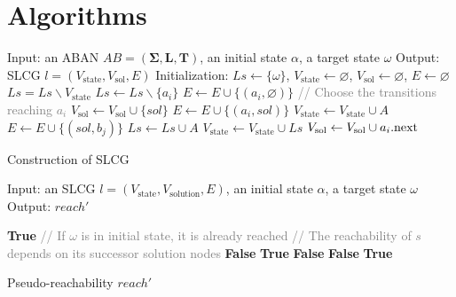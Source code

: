 \documentclass[runningheads]{llncs}
\newcommand{\st}{{\mathrm{state}}}
\newcommand{\sol}{{\mathrm{sol}}}
\begin{document}
\section{Algorithms}\label{appendix:algo}
\begin{algorithm}[ht]
\begin{algorithmic}
\State Input: an ABAN $AB=(\mathbf{\Sigma},\mathbf{L},\mathbf{T})$, an initial state $\alpha$, a target state $\omega$
\State Output: SLCG $l=(V_\st,V_\sol, E)$
\State Initialization: 
$Ls\gets \{\omega\}$, $V_\st\gets\varnothing$, $V_\sol\gets \varnothing$, $E\gets \varnothing$
    \State $Ls=Ls\backslash V_\st$
		\State $Ls\gets Ls\backslash \{a_i\}$
			$E\gets E\cup \{(a_i,\varnothing)\} $
    	\Else
    		 \textcolor{gray}{// Choose the transitions reaching $a_i$}
    		    \State $V_\sol\gets V_\sol\cup \{sol\}$
    		    \State $E\gets E\cup \{(a_i,sol)\} $
    			\State $V_\st\gets V_\st\cup {A}$
    				\State $E\gets E\cup \{(sol,b_j)\} $
    			\EndFor
    			\State $Ls\gets Ls\cup A$
                \State $V_\st\gets V_\st\cup Ls$
    		\EndFor
    		\State$V_\sol\gets V_\sol\cup a_i{\rm .next}$           
    	\EndIf
	\EndFor
\EndWhile
\State\Return{$(V_\st,V_\sol,E)$}
\end{algorithmic}
\caption{Construction of SLCG}\label{AlgConstructLCG}
\end{algorithm}

\begin{algorithm}[ht]
\begin{algorithmic}
\State Input: an SLCG $l=(V_\st, {V_\mathrm{solution}},E)$, an initial state $\alpha$, a target state $\omega$
\State Output:  $reach'$

\If {$\omega\in \alpha$}
   \Return \textbf{True} \textcolor{gray}{// If $\omega$ is in initial state, it is already reached}
\EndIf
\State \textcolor{gray}{// The reachability of $s$ depends on its successor solution nodes}
    \Return \textbf{False}
\EndIf
{}
    \Return \textbf{True}
    \EndIf
\EndFor
 \Return \textbf{False}
\EndProcedure
{}
    \Return \textbf{False}
    \EndIf
\EndFor
\Return \textbf{True}
\EndProcedure
\end{algorithmic}
\caption{Pseudo-reachability $reach'$}\label{algPseudo}
\end{algorithm}
\end{document}
